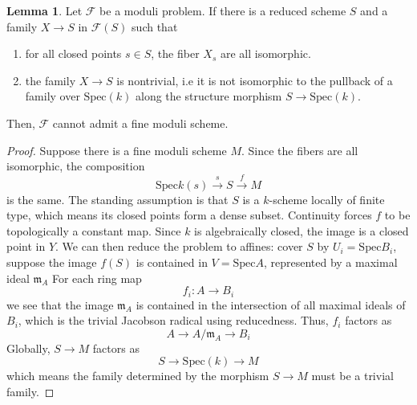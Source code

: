\documentclass{article}
\newcommand{\Spec}{\textrm{Spec}}
\theoremstyle{definition}
\theoremstyle{definition}
\theoremstyle{definition}
\theoremstyle{definition}
\theoremstyle{definition}
\newtheorem{lemma}[theorem]{Lemma}
\theoremstyle{definition}
\theoremstyle{definition}
\begin{document}
\begin{lemma}
	Let $\mathcal{F}$ be a moduli problem. If there is a reduced scheme $S$ and a family $X\to S$ in $\mathcal{F}(S)$ such that
	\begin{enumerate}
		\item for all closed points $s\in S$, the fiber $X_s$ are all isomorphic.
		\item the family $X\to S$ is nontrivial, i.e it is not isomorphic to the pullback of a family over $\Spec(k)$ along the structure morphism $S\to \Spec(k)$.
	\end{enumerate}


	Then, $\mathcal{F}$ cannot admit a fine moduli scheme.
\end{lemma}
\begin{proof}
	Suppose there is a fine moduli scheme $M$. Since the fibers are all isomorphic, the composition
	\[ \Spec k(s)\xrightarrow{s} S\xrightarrow{f} M\]
	is the same. The standing assumption is that $S$ is a $k$-scheme locally of finite type, which means its closed points form a dense subset. Continuity forces $f$ to be topologically a constant map. Since $k$ is algebraically closed, the image is a closed point in $Y$. We can then reduce the problem to affines: cover $S$ by $U_i= \Spec B_i$, suppose the image $f(S)$ is contained in $V= \Spec A$, represented by a maximal ideal $\mathfrak{m}_A$ For each ring map 
	\[ f_i: A\to B_i\]
	we see that the image $\mathfrak{m}_A$ is contained in the intersection of all maximal ideals of $B_i$, which is the trivial Jacobson radical using reducedness. Thus, $f_i$ factors as 
	\[ A\to A/\mathfrak{m}_A\to B_i\]
	Globally, $S\to M$ factors as 
	\[S\to \Spec (k)\to M\]
	which means the family determined by the morphism $S\to M$ must be a trivial family.


\end{proof}
\end{document}

